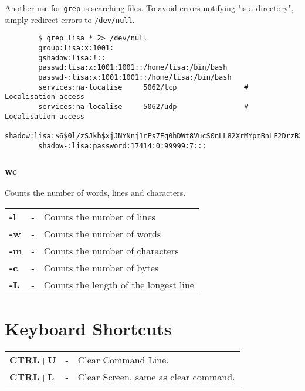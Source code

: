 \documentclass{report}
\begin{document}
	\noindent
	Another use for \verb|grep| is searching files. To avoid errors notifying "is a directory", simply redirect errors to \verb|/dev/null|.
	
	\begin{verbatim}
		$ grep lisa * 2> /dev/null
		group:lisa:x:1001:
		gshadow:lisa:!::
		passwd:lisa:x:1001:1001::/home/lisa:/bin/bash
		passwd-:lisa:x:1001:1001::/home/lisa:/bin/bash
		services:na-localise     5062/tcp                # Localisation access
		services:na-localise     5062/udp                # Localisation access
		shadow:lisa:$6$0l/zSJkh$xjJNYNnj1rPs7Fq0hDWt8VucS0nLL82XrMYpmBnLF2DrzB2npFvCwxM9MJEHgCHCwvabCgEA17LK2aU0h9FIT/:17414:0:99999:7:::
		shadow-:lisa:password:17414:0:99999:7:::
	\end{verbatim}
	
	\subsection{wc}
	Counts the number of words, lines and characters. 
	
	\begin{tabular}{lcl}
		\textbf{-l} &- &Counts the number of lines \\
		\textbf{-w} &- &Counts the number of words \\
		\textbf{-m} &- &Counts the number of characters \\
		\textbf{-c} &- &Counts the number of bytes \\
		\textbf{-L} &- &Counts the length of the longest line \\
	\end{tabular}
	
	\chapter{Keyboard Shortcuts}
	\begin{tabular}{lcl}
		\textbf{CTRL+U} &- &Clear Command Line. \\
		\textbf{CTRL+L} &- &Clear Screen, same as clear command. \\
	\end{tabular}
\end{document}
